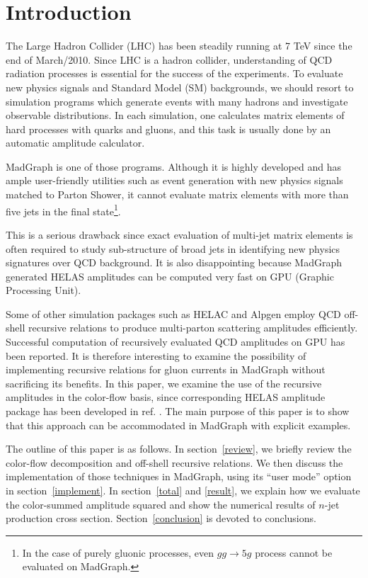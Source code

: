 \section{Introduction}
\label{intro}
The Large Hadron Collider (LHC) has been steadily running at 7 TeV since the
end of March/2010. Since LHC is a hadron
collider, understanding of QCD radiation processes is essential for the success of the experiments. To evaluate new physics signals
and Standard Model (SM) backgrounds, we should resort to simulation programs which generate
events with many hadrons and investigate observable distributions. In each simulation,
one calculates matrix elements of hard processes with quarks and gluons,
and this task is usually done by an automatic amplitude calculator.

 MadGraph\cite{MG}
is one of those programs. Although it is highly developed and
has ample user-friendly utilities such as event generation with new physics signals
matched to Parton Shower\cite{MG/ME}, it cannot evaluate matrix
elements with more than five jets in the final state\footnote{In the case of
purely gluonic processes, even $gg\rightarrow 5g$ process cannot be
evaluated on MadGraph\cite{GPU2}.}\cite{GPU2}.

This is a serious drawback since exact evaluation of multi-jet matrix
elements is often required to study sub-structure of broad jets in
identifying new physics signatures over QCD background. It is also
disappointing because MadGraph generated HELAS amplitudes\cite{HELAS}
can be computed very fast on GPU (Graphic Processing Unit)\cite{GPU1,GPU2}.

Some of other simulation packages such as HELAC and Alpgen\cite{HELAC,Alpgen} employ QCD off-shell recursive
relations to produce multi-parton scattering
amplitudes efficiently. Successful computation of recursively evaluated
QCD amplitudes on GPU has been reported\cite{giele2010}. It is therefore interesting to examine the
possibility of implementing recursive relations for gluon currents in MadGraph without
sacrificing its benefits. In this paper, we examine the use of the
recursive amplitudes in the color-flow basis, since corresponding HELAS
amplitude package has been developed in ref. \cite{fabio}. The main purpose of
this paper is to show that this approach can be accommodated in MadGraph
with explicit examples.

The outline of this paper is as follows. In section~\ref{review}, we briefly
review the color-flow decomposition and off-shell recursive relations.
We then discuss the implementation of those techniques in
MadGraph, using its ``user mode'' option\cite{MG/ME} in section~\ref{implement}. In
section~\ref{total} and \ref{result}, we explain how we evaluate the color-summed amplitude
squared and show the numerical results of $n$-jet production cross section.
Section~\ref{conclusion} is devoted
to conclusions.

